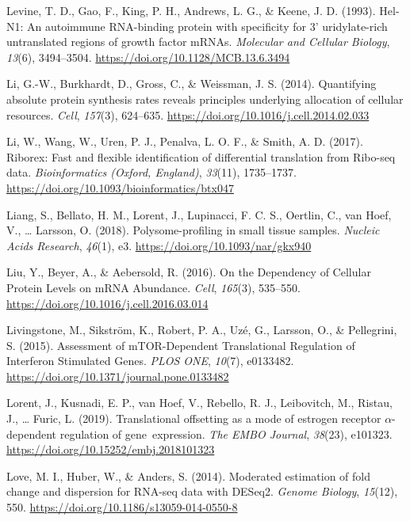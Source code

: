 \documentclass[12pt,openany]{book}
\begin{document}
\hypertarget{ref-Levine1993}{}
Levine, T. D., Gao, F., King, P. H., Andrews, L. G., \& Keene, J. D.
(1993). Hel-N1: An autoimmune RNA-binding protein with specificity for
3' uridylate-rich untranslated regions of growth factor mRNAs.
\emph{Molecular and Cellular Biology}, \emph{13}(6), 3494--3504.
\url{https://doi.org/10.1128/MCB.13.6.3494}

\hypertarget{ref-Li2014}{}
Li, G.-W., Burkhardt, D., Gross, C., \& Weissman, J. S. (2014).
Quantifying absolute protein synthesis rates reveals principles
underlying allocation of cellular resources. \emph{Cell}, \emph{157}(3),
624--635. \url{https://doi.org/10.1016/j.cell.2014.02.033}

\hypertarget{ref-Li2017}{}
Li, W., Wang, W., Uren, P. J., Penalva, L. O. F., \& Smith, A. D.
(2017). Riborex: Fast and flexible identification of differential
translation from Ribo-seq data. \emph{Bioinformatics (Oxford, England)},
\emph{33}(11), 1735--1737.
\url{https://doi.org/10.1093/bioinformatics/btx047}

\hypertarget{ref-Liang2018}{}
Liang, S., Bellato, H. M., Lorent, J., Lupinacci, F. C. S., Oertlin, C.,
van Hoef, V., \ldots{} Larsson, O. (2018). Polysome-profiling in small
tissue samples. \emph{Nucleic Acids Research}, \emph{46}(1), e3.
\url{https://doi.org/10.1093/nar/gkx940}

\hypertarget{ref-Liu2016}{}
Liu, Y., Beyer, A., \& Aebersold, R. (2016). On the Dependency of
Cellular Protein Levels on mRNA Abundance. \emph{Cell}, \emph{165}(3),
535--550. \url{https://doi.org/10.1016/j.cell.2016.03.014}

\hypertarget{ref-Livingstone2015}{}
Livingstone, M., Sikström, K., Robert, P. A., Uzé, G., Larsson, O., \&
Pellegrini, S. (2015). Assessment of mTOR-Dependent Translational
Regulation of Interferon Stimulated Genes. \emph{PLOS ONE},
\emph{10}(7), e0133482.
\url{https://doi.org/10.1371/journal.pone.0133482}

\hypertarget{ref-Lorent2019}{}
Lorent, J., Kusnadi, E. P., van Hoef, V., Rebello, R. J., Leibovitch,
M., Ristau, J., \ldots{} Furic, L. (2019). Translational offsetting as a
mode of estrogen receptor \(\alpha\)-dependent regulation of
gene~expression. \emph{The EMBO Journal}, \emph{38}(23), e101323.
\url{https://doi.org/10.15252/embj.2018101323}

\hypertarget{ref-Love2014}{}
Love, M. I., Huber, W., \& Anders, S. (2014). Moderated estimation of
fold change and dispersion for RNA-seq data with DESeq2. \emph{Genome
Biology}, \emph{15}(12), 550.
\url{https://doi.org/10.1186/s13059-014-0550-8}
\end{document}
